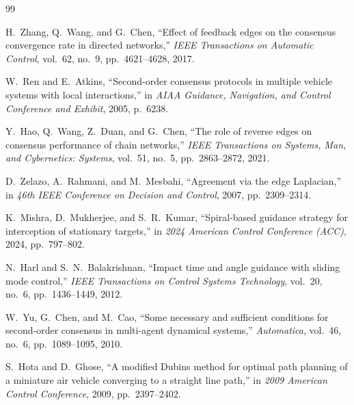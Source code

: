 \documentclass[openright,twoside]{iitbthesis}
\begin{document}
\begin{thebibliography}{99} %

H.~Zhang, Q.~Wang, and G.~Chen, 
``Effect of feedback edges on the consensus convergence rate in directed networks,'' 
\emph{IEEE Transactions on Automatic Control}, vol.~62, no.~9, pp.~4621--4628, 2017.

W.~Ren and E.~Atkins, 
``Second-order consensus protocols in multiple vehicle systems with local interactions,'' 
in \emph{AIAA Guidance, Navigation, and Control Conference and Exhibit}, 2005, p.~6238.

Y.~Hao, Q.~Wang, Z.~Duan, and G.~Chen, 
``The role of reverse edges on consensus performance of chain networks,'' 
\emph{IEEE Transactions on Systems, Man, and Cybernetics: Systems}, vol.~51, no.~5, pp.~2863--2872, 2021.

D.~Zelazo, A.~Rahmani, and M.~Mesbahi, 
``Agreement via the edge Laplacian,'' 
in \emph{46th IEEE Conference on Decision and Control}, 2007, pp.~2309--2314.

K.~Mishra, D.~Mukherjee, and S.~R.~Kumar, 
``Spiral-based guidance strategy for interception of stationary targets,'' 
in \emph{2024 American Control Conference (ACC)}, 2024, pp.~797--802.

N.~Harl and S.~N.~Balakrishnan, 
``Impact time and angle guidance with sliding mode control,'' 
\emph{IEEE Transactions on Control Systems Technology}, vol.~20, no.~6, pp.~1436--1449, 2012.

W.~Yu, G.~Chen, and M.~Cao, 
``Some necessary and sufficient conditions for second-order consensus in multi-agent dynamical systems,'' 
\emph{Automatica}, vol.~46, no.~6, pp.~1089--1095, 2010.

S.~Hota and D.~Ghose, 
``A modified Dubins method for optimal path planning of a miniature air vehicle converging to a straight line path,'' 
in \emph{2009 American Control Conference}, 2009, pp.~2397--2402.

\end{thebibliography}
\end{document}
